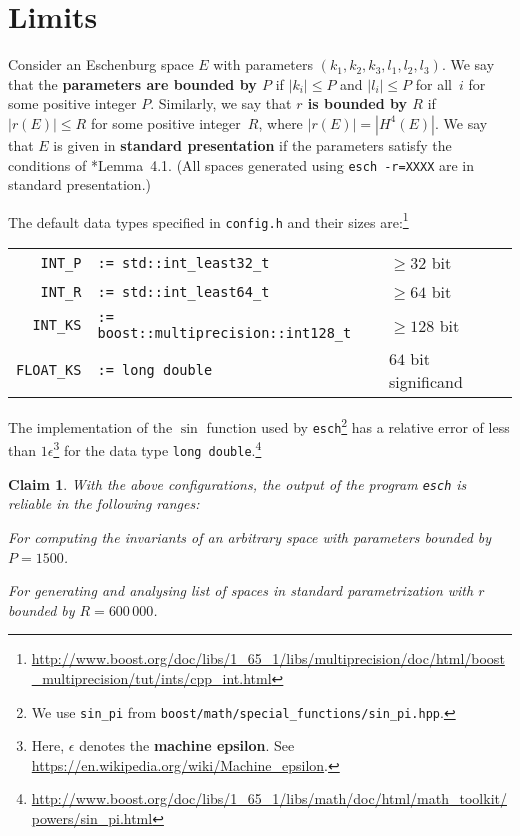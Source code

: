 \documentclass{article}
\newtheorem{claim}{Claim}
\newcommand{\abs}[1]{\left|#1\right|}
\newcommand{\macheps}{\epsilon} %
\begin{document}
\section*{Limits}
Consider an Eschenburg space \(E\) with parameters \((k_1,k_2,k_3,l_1,l_2,l_3)\).   We say that the \textbf{parameters are bounded by \(P\)} if \(\abs{k_i}\leq P\) and \(\abs{l_i}\leq P\) for all~\(i\) for some positive integer \(P\).  Similarly, we say that \textbf{\(r\) is bounded by \(R\)} if \(\abs{r(E)}\leq R\) for some positive integer~\(R\), where  \(\abs{r(E)} = |H^4(E)|\).  We say that \(E\) is given in \textbf{standard presentation} if the parameters satisfy the conditions of \cite{CEZ}*{Lemma~4.1}.  (All spaces generated using \verb+esch -r=XXXX+ are in standard presentation.)

The default data types specified in \verb+config.h+ and their sizes are:\footnote{
  \mbox{\url{http://www.boost.org/doc/libs/1_65_1/libs/multiprecision/doc/html/boost_multiprecision/tut/ints/cpp_int.html}}%
}

  \begin{tabular}{rp{22em}l}
    \verb+INT_P+ & \verb+:= std::int_least32_t+ & \(\geq 32\) bit \\
    \verb+INT_R+ & \verb+:= std::int_least64_t+ & \(\geq 64\) bit \\
    \verb+INT_KS+ & \verb+:= boost::multiprecision::int128_t+ & \(\geq 128\) bit \\
    \verb+FLOAT_KS+ & \verb+:= long double+ & \(64\) bit significand
  \end{tabular}

The implementation of the \(\sin\) function used by \verb+esch+\footnote{
  We use \verb+sin_pi+ from \verb+boost/math/special_functions/sin_pi.hpp+.%
}
has a relative error of less than \(1\macheps\)\footnote{
  Here, \(\macheps\) denotes the \textbf{machine epsilon}.
  See \url{https://en.wikipedia.org/wiki/Machine_epsilon}.%
}
for the data type \texttt{long double}.\footnote{
  \mbox{\url{http://www.boost.org/doc/libs/1_65_1/libs/math/doc/html/math_toolkit/powers/sin_pi.html}}%
}

\begin{claim}\label{claim:default}
  With the above configurations, the output of the program \verb+esch+ is reliable in the following ranges:
  \begin{compactitem}
  \item For computing the invariants of an arbitrary space with parameters bounded by \(P=1500\).
  \item For generating and analysing list of spaces in standard parametrization with \(r\) bounded by \(R=600\,000\).
  \end{compactitem}
\end{claim}
\end{document}
